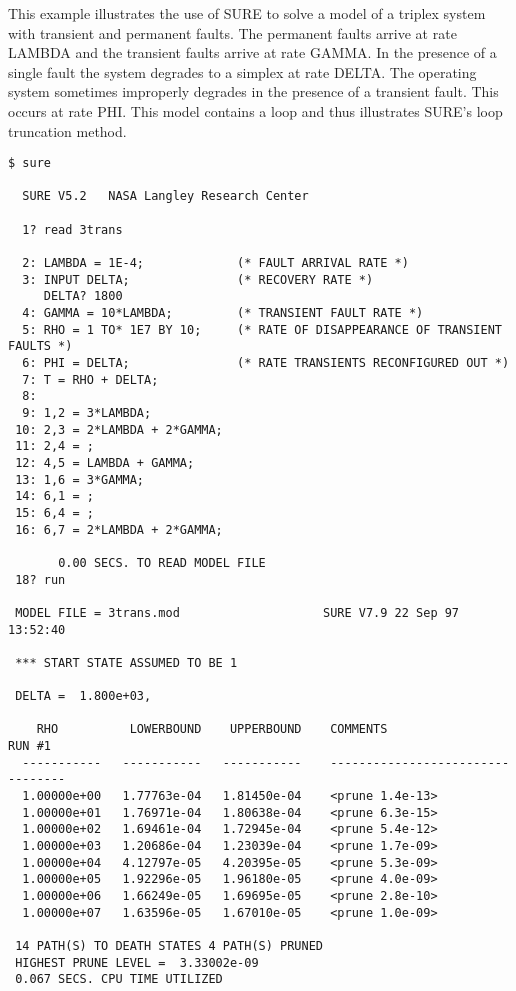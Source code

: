 This example illustrates the use of SURE to solve a model of a triplex system
with transient and permanent faults.  The permanent faults arrive at rate
{\isf LAMBDA} and the transient faults arrive at rate {\isf GAMMA.}  In the
presence of a single fault the system degrades to a simplex at rate {\isf
DELTA.}  The operating system sometimes improperly degrades in the presence of
a transient fault.  This occurs at rate {\isf PHI.}  This model contains a
loop and thus illustrates SURE's loop truncation method.
\begin{verbatim}
$ sure

  SURE V5.2   NASA Langley Research Center

  1? read 3trans

  2: LAMBDA = 1E-4;             (* FAULT ARRIVAL RATE *)
  3: INPUT DELTA;               (* RECOVERY RATE *)
     DELTA? 1800
  4: GAMMA = 10*LAMBDA;         (* TRANSIENT FAULT RATE *)
  5: RHO = 1 TO* 1E7 BY 10;     (* RATE OF DISAPPEARANCE OF TRANSIENT FAULTS *)
  6: PHI = DELTA;               (* RATE TRANSIENTS RECONFIGURED OUT *)
  7: T = RHO + DELTA;
  8:
  9: 1,2 = 3*LAMBDA;
 10: 2,3 = 2*LAMBDA + 2*GAMMA;
 11: 2,4 = ;
 12: 4,5 = LAMBDA + GAMMA;
 13: 1,6 = 3*GAMMA;
 14: 6,1 = ;
 15: 6,4 = ;
 16: 6,7 = 2*LAMBDA + 2*GAMMA;

       0.00 SECS. TO READ MODEL FILE
 18? run

 MODEL FILE = 3trans.mod                    SURE V7.9 22 Sep 97  13:52:40

 *** START STATE ASSUMED TO BE 1

 DELTA =  1.800e+03,  

    RHO          LOWERBOUND    UPPERBOUND    COMMENTS                 RUN #1
  -----------   -----------   -----------    ---------------------------------
  1.00000e+00   1.77763e-04   1.81450e-04    <prune 1.4e-13>
  1.00000e+01   1.76971e-04   1.80638e-04    <prune 6.3e-15>
  1.00000e+02   1.69461e-04   1.72945e-04    <prune 5.4e-12>
  1.00000e+03   1.20686e-04   1.23039e-04    <prune 1.7e-09>
  1.00000e+04   4.12797e-05   4.20395e-05    <prune 5.3e-09>
  1.00000e+05   1.92296e-05   1.96180e-05    <prune 4.0e-09>
  1.00000e+06   1.66249e-05   1.69695e-05    <prune 2.8e-10>
  1.00000e+07   1.63596e-05   1.67010e-05    <prune 1.0e-09>

 14 PATH(S) TO DEATH STATES 4 PATH(S) PRUNED
 HIGHEST PRUNE LEVEL =  3.33002e-09
 0.067 SECS. CPU TIME UTILIZED

\end{verbatim}

